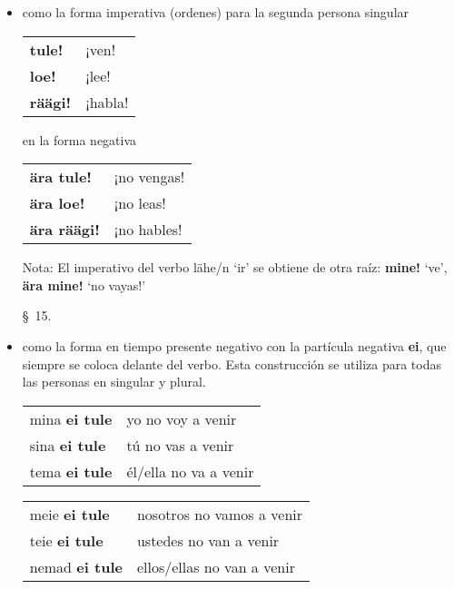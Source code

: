\begin{itemize}
	\item como la forma imperativa (ordenes) para la segunda persona singular

	\begin{center}
	\begin{tabular}{ l l }
		\textbf{tule!}	& ¡ven! \\
		\textbf{loe!}	& ¡lee! \\
		\textbf{räägi!}	& ¡habla!
	\end{tabular}	
	\end{center}

	en la forma negativa

	\begin{center}
	\begin{tabular}{ l l }
		\textbf{ära tule!}	& ¡no vengas! \\
		\textbf{ära loe!}	& ¡no leas! \\
		\textbf{ära räägi!}	& ¡no hables!
	\end{tabular}	
	\end{center}

	Nota: El imperativo del verbo lähe/n `ir' se obtiene de otra raíz: \textbf{mine!} `ve', \textbf{ära mine!} `no vayas!'

	\S\ 15. 

	\item como la forma en tiempo presente negativo con la partícula negativa \textbf{ei}, que siempre se coloca delante del verbo. Esta construcción se utiliza para todas las personas en singular y plural.

	\begin{center}
	\begin{tabular}{ l l }
		mina \textbf{ei tule}	& yo no voy a venir \\
		sina \textbf{ei tule}	& tú no vas a venir \\
		tema \textbf{ei tule}	& él/ella no va a venir
	\end{tabular}	
	\end{center}	

	\begin{center}
	\begin{tabular}{ l l }
		meie \textbf{ei tule}	& nosotros no vamos a venir \\
		teie \textbf{ei tule}	& ustedes no van a venir \\
		nemad \textbf{ei tule}	& ellos/ellas no van a venir
	\end{tabular}	
	\end{center}	
\end{itemize}

